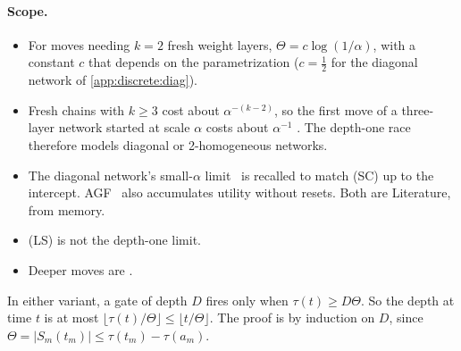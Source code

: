 \paragraph{Scope.}
\begin{itemize}[nosep]
\item For moves needing $k=2$ fresh weight layers, $\Theta=c\log(1/\alpha)$, with a constant $c$ that depends on the parametrization ($c=\frac12$ for the diagonal network of \cref{app:discrete:diag}).
\item Fresh chains with $k\ge3$ cost about $\alpha^{-(k-2)}$, so the first move of a three-layer network started at scale $\alpha$ costs about $\alpha^{-1}$ . The depth-one race therefore models diagonal or 2-homogeneous networks.
\item The diagonal network's small-$\alpha$ limit~\cite{pesme2023saddle} is recalled to match (SC) up to the intercept. AGF~\cite{kunin2025agf} also accumulates utility without resets. Both are Literature, from memory.
\item (LS) is not the depth-one limit.
\item Deeper moves are .
\end{itemize}

\begin{proposition}\label{prop:app-A21}
\quad In either variant, a gate of depth $D$ fires only when $\tau(t)\ge D\Theta$. So the depth at time $t$ is at most $\lfloor\tau(t)/\Theta\rfloor\le\lfloor t/\Theta\rfloor$. The proof is by induction on $D$, since $\Theta=|S_m(t_m)|\le\tau(t_m)-\tau(a_m)$.
\end{proposition}


